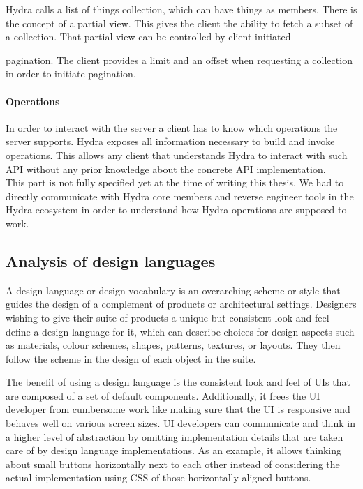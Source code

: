 Hydra calls a list of things collection, which can have things as members. There is the concept of a partial view. This gives the client the ability to fetch a subset of a collection. That partial view can be controlled by client initiated {\gls{pagination}. The client provides a limit and an offset when requesting a collection in order to initiate pagination.

\paragraph{Operations}
In order to interact with the server a client has to know which operations the server supports. Hydra exposes all information necessary to build and invoke operations. This allows any client that understands Hydra to interact with such API without any prior knowledge about the concrete API implementation. \\
This part is not fully specified yet at the time of writing this thesis. We had to directly communicate with Hydra core members and reverse engineer tools in the Hydra ecosystem in order to understand how Hydra operations are supposed to work.

\subsection{Analysis of design languages}
A design language or design vocabulary is an overarching scheme or style that guides the design of a complement of products or architectural settings. Designers wishing to give their suite of products a unique but consistent look and feel define a design language for it, which can describe choices for design aspects such as materials, colour schemes, shapes, patterns, textures, or layouts. They then follow the scheme in the design of each object in the suite. \citep{designlanguage}

The benefit of using a design language is the consistent look and feel of UIs that are composed of a set of default components. Additionally, it frees the UI developer from cumbersome work like making sure that the UI is responsive and behaves well on various screen sizes. UI developers can communicate and think in a higher level of abstraction by omitting implementation details that are taken care of by design language implementations. As an example, it allows thinking about small buttons horizontally next to each other instead of considering the actual implementation using CSS of those horizontally aligned buttons.

}
